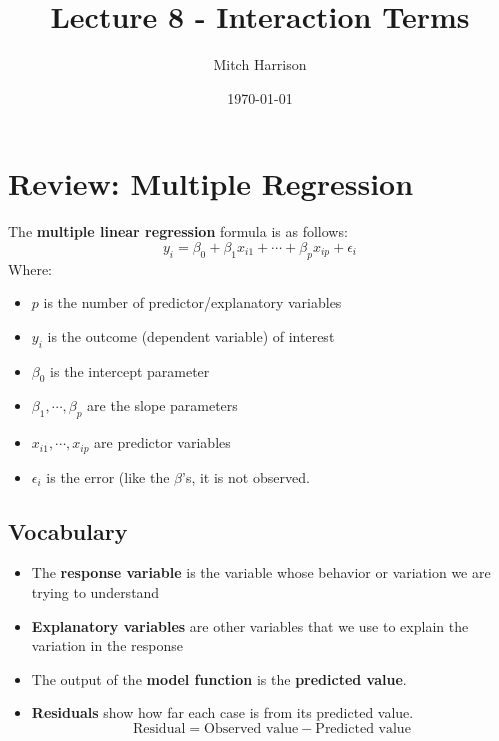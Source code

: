 \documentclass[titlepage, 12pt, leqno]{article}
\title{\Huge{Lecture 8 - Interaction Terms}}
\author{\large{Mitch Harrison}}
\date{\today}
\begin{document}
\setlength{\parskip}{1\baselineskip}
\setlength{\parindent}{15pt}
\maketitle
\tableofcontents
\newpage


\section{Review: Multiple Regression}

The \textbf{multiple linear regression} formula is as follows:
\[
    y_i =\beta_0 +\beta_1x_{i1} + \cdots +\beta_px_{ip} +\epsilon_i
\]
Where:
\begin{itemize}
    \item $p$ is the number of predictor/explanatory variables
    \item $y_i$ is the outcome (dependent variable) of interest
    \item $\beta_0$ is the intercept parameter
    \item $\beta_1, \cdots , \beta_p$ are the slope parameters
    \item $x_{i1}, \cdots , x_{ip}$ are predictor variables
    \item $\epsilon_i$ is the error (like the $\beta$'s, it is not observed.
\end{itemize}

\subsection{Vocabulary}
\begin{itemize}
    \item The \textbf{response variable} is the variable whose behavior or
        variation we are trying to understand
    \item \textbf{Explanatory variables} are other variables that we use to 
        explain the variation in the response
    \item The output of the \textbf{model function} is the \textbf{predicted
        value}.
    \item \textbf{Residuals} show how far each case is from its predicted value.
        \[
        \text{Residual} = \text{Observed value} - \text{Predicted value}
        \]
\end{itemize}
\end{document}
